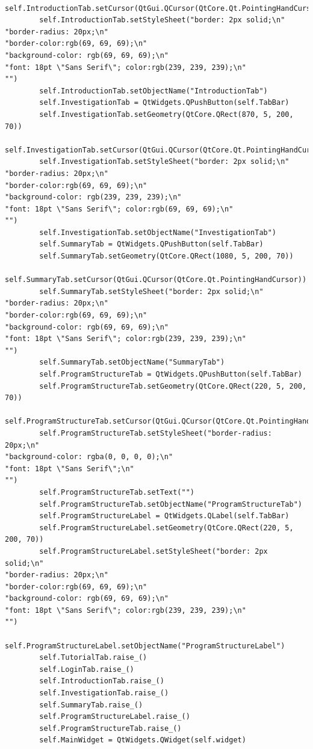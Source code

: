 \documentclass{article}
\begin{document}
\begin{lstlisting}
        self.IntroductionTab.setCursor(QtGui.QCursor(QtCore.Qt.PointingHandCursor))
        self.IntroductionTab.setStyleSheet("border: 2px solid;\n"
"border-radius: 20px;\n"
"border-color:rgb(69, 69, 69);\n"
"background-color: rgb(69, 69, 69);\n"
"font: 18pt \"Sans Serif\"; color:rgb(239, 239, 239);\n"
"")
        self.IntroductionTab.setObjectName("IntroductionTab")
        self.InvestigationTab = QtWidgets.QPushButton(self.TabBar)
        self.InvestigationTab.setGeometry(QtCore.QRect(870, 5, 200, 70))
        self.InvestigationTab.setCursor(QtGui.QCursor(QtCore.Qt.PointingHandCursor))
        self.InvestigationTab.setStyleSheet("border: 2px solid;\n"
"border-radius: 20px;\n"
"border-color:rgb(69, 69, 69);\n"
"background-color: rgb(239, 239, 239);\n"
"font: 18pt \"Sans Serif\"; color:rgb(69, 69, 69);\n"
"")
        self.InvestigationTab.setObjectName("InvestigationTab")
        self.SummaryTab = QtWidgets.QPushButton(self.TabBar)
        self.SummaryTab.setGeometry(QtCore.QRect(1080, 5, 200, 70))
        self.SummaryTab.setCursor(QtGui.QCursor(QtCore.Qt.PointingHandCursor))
        self.SummaryTab.setStyleSheet("border: 2px solid;\n"
"border-radius: 20px;\n"
"border-color:rgb(69, 69, 69);\n"
"background-color: rgb(69, 69, 69);\n"
"font: 18pt \"Sans Serif\"; color:rgb(239, 239, 239);\n"
"")
        self.SummaryTab.setObjectName("SummaryTab")
        self.ProgramStructureTab = QtWidgets.QPushButton(self.TabBar)
        self.ProgramStructureTab.setGeometry(QtCore.QRect(220, 5, 200, 70))
        self.ProgramStructureTab.setCursor(QtGui.QCursor(QtCore.Qt.PointingHandCursor))
        self.ProgramStructureTab.setStyleSheet("border-radius: 20px;\n"
"background-color: rgba(0, 0, 0, 0);\n"
"font: 18pt \"Sans Serif\";\n"
"")
        self.ProgramStructureTab.setText("")
        self.ProgramStructureTab.setObjectName("ProgramStructureTab")
        self.ProgramStructureLabel = QtWidgets.QLabel(self.TabBar)
        self.ProgramStructureLabel.setGeometry(QtCore.QRect(220, 5, 200, 70))
        self.ProgramStructureLabel.setStyleSheet("border: 2px solid;\n"
"border-radius: 20px;\n"
"border-color:rgb(69, 69, 69);\n"
"background-color: rgb(69, 69, 69);\n"
"font: 18pt \"Sans Serif\"; color:rgb(239, 239, 239);\n"
"")
        self.ProgramStructureLabel.setObjectName("ProgramStructureLabel")
        self.TutorialTab.raise_()
        self.LoginTab.raise_()
        self.IntroductionTab.raise_()
        self.InvestigationTab.raise_()
        self.SummaryTab.raise_()
        self.ProgramStructureLabel.raise_()
        self.ProgramStructureTab.raise_()
        self.MainWidget = QtWidgets.QWidget(self.widget)

\end{lstlisting}
\end{document}
